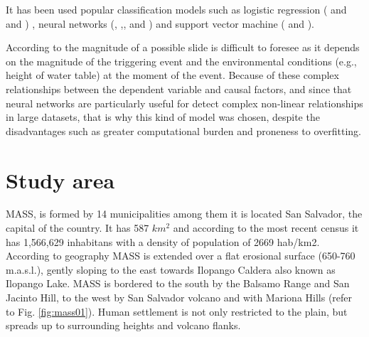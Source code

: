 \documentclass[11pt,twoside]{rmta2010esp}%
\begin{document}
It has been used popular classification models such as logistic regression (\cite{akgun2012} and \cite{gaskill} and \cite{garcia2008} ) , neural networks (\cite{garcia2010}, \cite{Melchiorre2011410},\cite{Zeng2001374}, \cite{Ermini2005327} and \cite{Yesilnacar2005251})  and support vector machine (\cite{ballabio2012support} and \cite{tien2012landslide}). 


According to \cite{van2006landslide} the magnitude of a possible
slide is difficult to foresee as it depends on the magnitude of the triggering event and the environmental conditions (e.g., height of water table) at the moment of the event. Because of these complex relationships between the dependent variable and causal factors, and since that neural networks are particularly useful for detect complex non-linear relationships in large datasets, that is why this kind of model was chosen, despite the disadvantages such as greater computational burden and proneness to overfitting.  



\section{Study area}
\label{sec:studyarea}
MASS, is formed by 14 municipalities among them it is located San Salvador, the capital of the country. It has 587 $km^{2}$ and according to the most recent census \cite{minecon} it has 1,566,629 inhabitans with a density of population of 2669 hab/km2.  According to geography MASS is extended over a flat erosional surface (650-760 m.a.s.l.), gently sloping to the east towards Ilopango Caldera also known as Ilopango Lake. MASS is bordered to the south by the Balsamo Range and San Jacinto Hill, to the west by San Salvador volcano and with Mariona Hills (refer to Fig. \ref{fig:mass01}). Human settlement is not only restricted to the plain, but spreads up to surrounding heights and volcano flanks.
\end{document}
